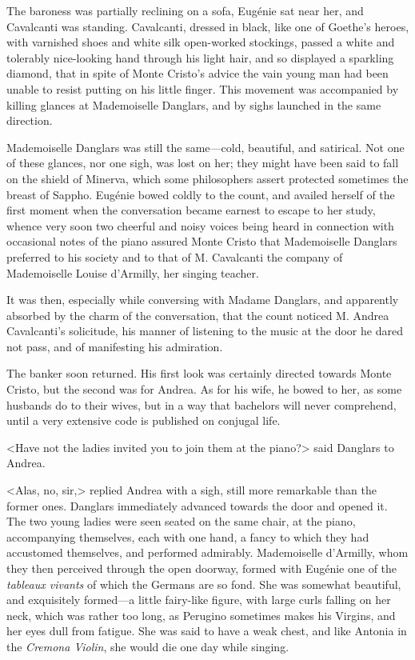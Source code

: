  The baroness was partially reclining on a sofa, Eugénie sat near her, and Cavalcanti was standing. Cavalcanti, dressed in black, like one of Goethe's heroes, with varnished shoes and white silk open-worked stockings, passed a white and tolerably nice-looking hand through his light hair, and so displayed a sparkling diamond, that in spite of Monte Cristo's advice the vain young man had been unable to resist putting on his little finger. This movement was accompanied by killing glances at Mademoiselle Danglars, and by sighs launched in the same direction. 

 Mademoiselle Danglars was still the same—cold, beautiful, and satirical. Not one of these glances, nor one sigh, was lost on her; they might have been said to fall on the shield of Minerva, which some philosophers assert protected sometimes the breast of Sappho. Eugénie bowed coldly to the count, and availed herself of the first moment when the conversation became earnest to escape to her study, whence very soon two cheerful and noisy voices being heard in connection with occasional notes of the piano assured Monte Cristo that Mademoiselle Danglars preferred to his society and to that of M. Cavalcanti the company of Mademoiselle Louise d'Armilly, her singing teacher. 

 It was then, especially while conversing with Madame Danglars, and apparently absorbed by the charm of the conversation, that the count noticed M. Andrea Cavalcanti's solicitude, his manner of listening to the music at the door he dared not pass, and of manifesting his admiration. 

 The banker soon returned. His first look was certainly directed towards Monte Cristo, but the second was for Andrea. As for his wife, he bowed to her, as some husbands do to their wives, but in a way that bachelors will never comprehend, until a very extensive code is published on conjugal life. 

 <Have not the ladies invited you to join them at the piano?> said Danglars to Andrea. 

 <Alas, no, sir,> replied Andrea with a sigh, still more remarkable than the former ones. Danglars immediately advanced towards the door and opened it.  The two young ladies were seen seated on the same chair, at the piano, accompanying themselves, each with one hand, a fancy to which they had accustomed themselves, and performed admirably. Mademoiselle d'Armilly, whom they then perceived through the open doorway, formed with Eugénie one of the \textit{tableaux vivants} of which the Germans are so fond. She was somewhat beautiful, and exquisitely formed—a little fairy-like figure, with large curls falling on her neck, which was rather too long, as Perugino sometimes makes his Virgins, and her eyes dull from fatigue. She was said to have a weak chest, and like Antonia in the \textit{Cremona Violin}, she would die one day while singing. 

